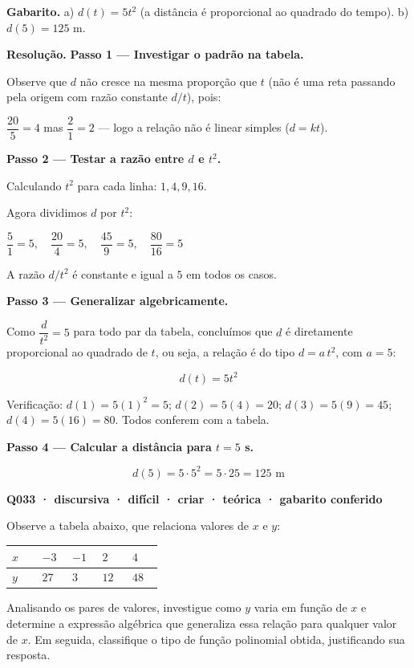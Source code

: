 \documentclass[11pt,a4paper]{article}
\begin{document}
\textbf{Gabarito.} a) $d(t) = 5t^2$ (a distância é proporcional ao quadrado do tempo). b) $d(5) = 125$ m.

\textbf{Resolução.} \textbf{Passo 1 — Investigar o padrão na tabela.}

Observe que $d$ não cresce na mesma proporção que $t$ (não é uma reta passando pela origem com razão constante $d/t$), pois:

$\dfrac{20}{5}=4$ mas $\dfrac{2}{1}=2$ — logo a relação não é linear simples ($d = kt$).

\textbf{Passo 2 — Testar a razão entre $d$ e $t^2$.}

Calculando $t^2$ para cada linha: $1, 4, 9, 16$.

Agora dividimos $d$ por $t^2$:

$\dfrac{5}{1}=5,\quad \dfrac{20}{4}=5,\quad \dfrac{45}{9}=5,\quad \dfrac{80}{16}=5$

A razão $d/t^2$ é constante e igual a $5$ em todos os casos.

\textbf{Passo 3 — Generalizar algebricamente.}

Como $\dfrac{d}{t^2}=5$ para todo par da tabela, concluímos que $d$ é diretamente proporcional ao quadrado de $t$, ou seja, a relação é do tipo $d = a\,t^2$, com $a=5$:

$$d(t) = 5t^2$$

Verificação: $d(1)=5(1)^2=5$; $d(2)=5(4)=20$; $d(3)=5(9)=45$; $d(4)=5(16)=80$. Todos conferem com a tabela.

\textbf{Passo 4 — Calcular a distância para $t=5$ s.}

$$d(5) = 5\cdot 5^2 = 5\cdot 25 = 125 \text{ m}$$

\bigskip\noindent\textbf{Q033 · discursiva · difícil · criar · teórica · gabarito conferido}\par\nopagebreak
Observe a tabela abaixo, que relaciona valores de $x$ e $y$:

\begin{center}
\begin{tabular}{|p{0.172\linewidth}|p{0.172\linewidth}|p{0.172\linewidth}|p{0.172\linewidth}|p{0.172\linewidth}|}
\hline
\textbf{$x$} & \textbf{$-3$} & \textbf{$-1$} & \textbf{$2$} & \textbf{$4$} \\
\hline
$y$ & $27$ & $3$ & $12$ & $48$ \\
\hline
\end{tabular}
\end{center}

Analisando os pares de valores, investigue como $y$ varia em função de $x$ e determine a expressão algébrica que generaliza essa relação para qualquer valor de $x$. Em seguida, classifique o tipo de função polinomial obtida, justificando sua resposta.
\end{document}
